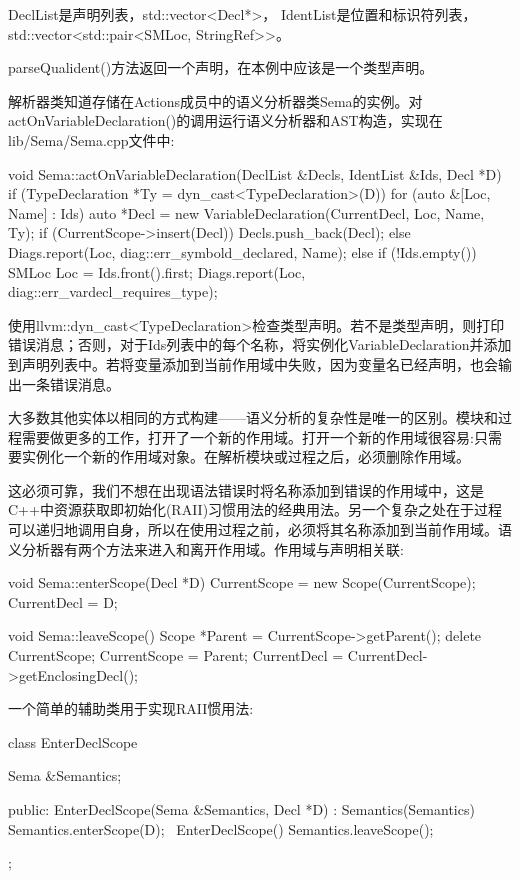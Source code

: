 DeclList是声明列表，std::vector<Decl*>， IdentList是位置和标识符列表，std::vector<std::pair<SMLoc, StringRef>{}>。

parseQualident()方法返回一个声明，在本例中应该是一个类型声明。

解析器类知道存储在Actions成员中的语义分析器类Sema的实例。对actOnVariableDeclaration()的调用运行语义分析器和AST构造，实现在lib/Sema/Sema.cpp文件中:

\begin{cpp}
void Sema::actOnVariableDeclaration(DeclList &Decls,
IdentList &Ids,
Decl *D) {
    if (TypeDeclaration *Ty = dyn_cast<TypeDeclaration>(D)) {
        for (auto &[Loc, Name] : Ids) {
            auto *Decl = new VariableDeclaration(CurrentDecl, Loc,
            Name, Ty);
            if (CurrentScope->insert(Decl))
                Decls.push_back(Decl);
            else
                Diags.report(Loc, diag::err_symbold_declared, Name);
        }
    } else if (!Ids.empty()) {
        SMLoc Loc = Ids.front().first;
        Diags.report(Loc, diag::err_vardecl_requires_type);
    }
}
\end{cpp}

使用llvm::dyn\_cast<TypeDeclaration>检查类型声明。若不是类型声明，则打印错误消息；否则，对于Ids列表中的每个名称，将实例化VariableDeclaration并添加到声明列表中。若将变量添加到当前作用域中失败，因为变量名已经声明，也会输出一条错误消息。

大多数其他实体以相同的方式构建——语义分析的复杂性是唯一的区别。模块和过程需要做更多的工作，打开了一个新的作用域。打开一个新的作用域很容易:只需要实例化一个新的作用域对象。在解析模块或过程之后，必须删除作用域。

这必须可靠，我们不想在出现语法错误时将名称添加到错误的作用域中，这是C++中资源获取即初始化(RAII)习惯用法的经典用法。另一个复杂之处在于过程可以递归地调用自身，所以在使用过程之前，必须将其名称添加到当前作用域。语义分析器有两个方法来进入和离开作用域。作用域与声明相关联:

\begin{cpp}
void Sema::enterScope(Decl *D) {
    CurrentScope = new Scope(CurrentScope);
    CurrentDecl = D;
}

void Sema::leaveScope() {
    Scope *Parent = CurrentScope->getParent();
    delete CurrentScope;
    CurrentScope = Parent;
    CurrentDecl = CurrentDecl->getEnclosingDecl();
}
\end{cpp}

一个简单的辅助类用于实现RAII惯用法:

\begin{cpp}
class EnterDeclScope {
    Sema &Semantics;

public:
    EnterDeclScope(Sema &Semantics, Decl *D)
    : Semantics(Semantics) {
        Semantics.enterScope(D);
    }
    ~EnterDeclScope() { Semantics.leaveScope(); }
};
\end{cpp}

